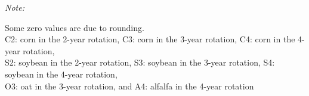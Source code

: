 \documentclass[
]{article}
\begin{document}
\begin{landscape}
\begin{table}
\begin{threeparttable}
\begin{tablenotes}[para]
\item \textit{Note:} 
\item{Some zero values are due to rounding.\\  
C2: corn in the 2-year rotation, C3: corn in the 3-year rotation, C4: corn in the 4-year rotation, \\
S2: soybean in the 2-year rotation, S3: soybean in the 3-year rotation, S4: soybean in the 4-year rotation, \\
O3: oat in the 3-year rotation, and A4: alfalfa in the 4-year rotation}
\end{tablenotes}
\end{threeparttable}
\end{table}
\end{landscape}


\begin{landscape}\begin{table}


\end{table}
\end{landscape}
\end{document}
